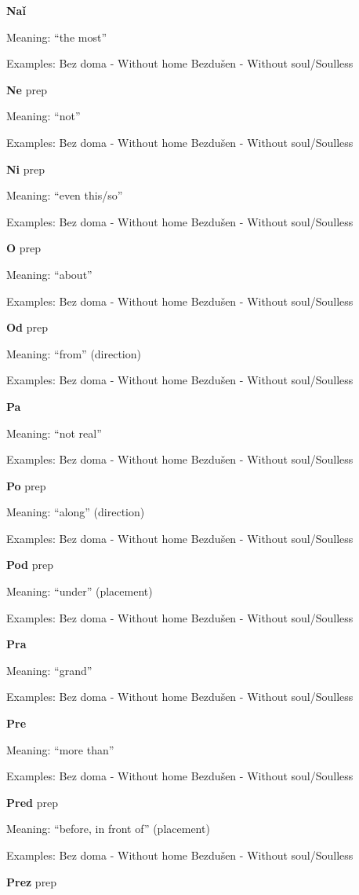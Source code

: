 \textbf{Naǐ}

Meaning: “the most”

Examples:
Bez doma - Without home
Bezdušen - Without soul/Soulless 


\textbf{Ne} \gls{prep}

Meaning: “not”

Examples:
Bez doma - Without home
Bezdušen - Without soul/Soulless 

\textbf{Ni} \gls{prep}

Meaning: “even this/so”

Examples:
Bez doma - Without home
Bezdušen - Without soul/Soulless 

\textbf{O}  \gls{prep}

Meaning: “about”

Examples:
Bez doma - Without home
Bezdušen - Without soul/Soulless 

\textbf{Od} \gls{prep}

Meaning: “from” (direction)

Examples:
Bez doma - Without home
Bezdušen - Without soul/Soulless 

\textbf{Pa}

Meaning: “not real”

Examples:
Bez doma - Without home
Bezdušen - Without soul/Soulless 


\textbf{Po} \gls{prep}

Meaning: “along” (direction)

Examples:
Bez doma - Without home
Bezdušen - Without soul/Soulless 

\textbf{Pod} \gls{prep}

Meaning: “under” (placement)

Examples:
Bez doma - Without home
Bezdušen - Without soul/Soulless 

\textbf{Pra}

Meaning: “grand”

Examples:
Bez doma - Without home
Bezdušen - Without soul/Soulless 

\textbf{Pre}

Meaning: “more than”

Examples:
Bez doma - Without home
Bezdušen - Without soul/Soulless 

\textbf{Pred} \gls{prep}

Meaning: “before, in front of” (placement)

Examples:
Bez doma - Without home
Bezdušen - Without soul/Soulless 

\textbf{Prez} \gls{prep}

